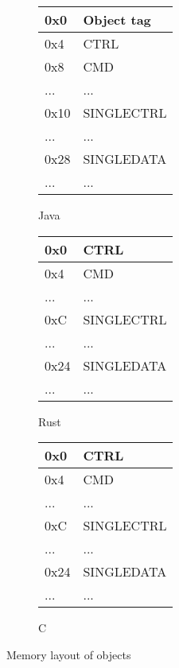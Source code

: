 \begin{figure}[H]

  \centering
  \begin{subfigure}{0.31\textwidth}
    \begin{tabular}{|l|l|}
      \hline
      0x0&Object tag \\ \hline
      0x4&CTRL       \\ \hline
      0x8&CMD        \\ \hline
      ...&...        \\ \hline
      0x10&SINGLECTRL\\ \hline
      ...&...        \\ \hline
      0x28&SINGLEDATA\\ \hline
      ...&...        \\ \hline
    \end{tabular}
    \caption{Java}
    \label{fig:back:memlayout:java}
  \end{subfigure}
  \hfill
  \begin{subfigure}{0.31\textwidth}
    \begin{tabular}{|l|l|}
      \hline
      0x0&CTRL       \\ \hline
      0x4&CMD        \\ \hline
      ...&...        \\ \hline
      0xC&SINGLECTRL \\ \hline
      ...&...        \\ \hline
      0x24&SINGLEDATA\\ \hline
      ...&...        \\ \hline
    \end{tabular}
    \caption{Rust}
    \label{fig:back:memlayout:rust}
  \end{subfigure}
  \hfill
  \begin{subfigure}{0.31\textwidth}
    \begin{tabular}{|l|l|}
      \hline
      0x0&CTRL       \\ \hline
      0x4&CMD        \\ \hline
      ...&...        \\ \hline
      0xC&SINGLECTRL \\ \hline
      ...&...        \\ \hline
      0x24&SINGLEDATA\\ \hline
      ...&...        \\ \hline
    \end{tabular}
        \caption{C}
    \label{fig:back:memlayout:c}
  \end{subfigure}
  \caption{Memory layout of objects}
  \label{fig:back:memlayout}

\end{figure}

